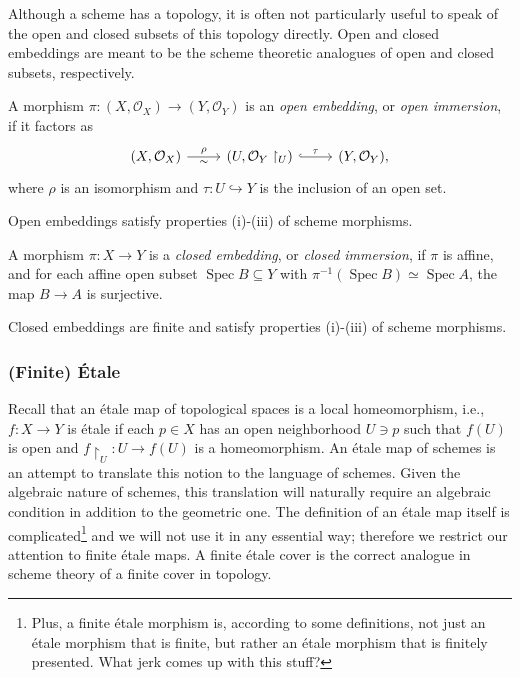 \documentclass[11pt,openany]{book} %
\newcommand{\spc}{\operatorname{Spec}}
\begin{document}
Although a scheme has a topology, it is often not particularly useful to speak of the open and closed subsets of this topology directly. Open and closed embeddings are meant to be the scheme theoretic analogues of open and closed subsets, respectively.\\

\begin{definition}
A morphism $\pi : (X, \mathcal{O}_X) \to (Y, \mathcal{O}_Y)$ is an \emph{open embedding}, or \emph{open immersion}, if it factors as
\[
\begin{tikzcd}
(X, \mathcal{O}_X) \ar[r, "\rho", "\sim"'] & (U,\mathcal{O}_Y\restriction_U) \ar[r, hook, "\tau"] & (Y, \mathcal{O}_Y),
\end{tikzcd}
\]
where $\rho$ is an isomorphism and $\tau : U \hookrightarrow Y$ is the inclusion of an open set.
\end{definition}

\begin{proposition}
Open embeddings satisfy properties (i)-(iii) of scheme morphisms.
\end{proposition}

\begin{definition}
A morphism $\pi : X \to Y$ is a \emph{closed embedding}, or \emph{closed immersion}, if $\pi$ is affine, and for each affine open subset $\spc B \subseteq Y$ with $\pi^{-1}(\spc B) \simeq \spc A$, the map $B \to A$ is surjective.
\end{definition}

\begin{proposition}
Closed embeddings are finite and satisfy properties (i)-(iii) of scheme morphisms.
\end{proposition}

\subsubsection{(Finite) \'Etale}

Recall that an \'etale map of topological spaces is a local homeomorphism, i.e., $f : X \to Y$ is \'etale if each $p \in X$ has an open neighborhood $U \ni p$ such that $f(U)$ is open and $f\restriction_U : U \to f(U)$ is a homeomorphism. An \'etale map of schemes is an attempt to translate this notion to the language of schemes. Given the algebraic nature of schemes, this translation will naturally require an algebraic condition in addition to the geometric one. The definition of an \'etale map itself is complicated\footnote{Plus, a finite \'etale morphism is, according to some definitions, not just an \'etale morphism that is finite, but rather an \'etale morphism that is finitely presented. What jerk comes up with this stuff?} and we will not use it in any essential way; therefore we restrict our attention to finite \'etale maps. A finite \'etale cover is the correct analogue in scheme theory of a finite cover in topology.\\
\end{document}
